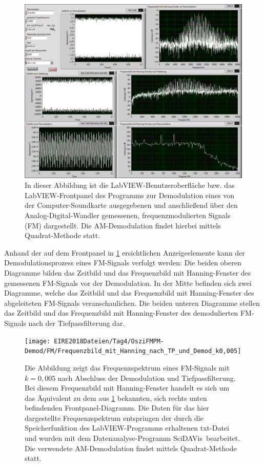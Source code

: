 \documentclass[
a4paper,
12pt,
pagesize,
ngerman
]{scrartcl}
\begin{document}
	\begin{figure}[H]
		\centering
		\includegraphics[width=1.0\textwidth]{EIRE2018Dateien/Tag4/OsziFMPM-Demod/FM/OsziPlusFMPMp}
		\caption{In dieser Abbildung ist die LabVIEW-Benutzeroberfläche bzw. das LabVIEW-Frontpanel des Programms zur Demodulation eines von der Computer-Soundkarte ausgegebenen und anschließend über den Analog-Digital-Wandler gemessenen, frequenzmodulierten Signals (\glqq FM\grqq ) dargestellt. Die AM-Demodulation findet hierbei mittels \glqq Quadrat\grqq -Methode statt.}
		\label{FMPMDemodFrontpanel}
	\end{figure}
	
	\noindent Anhand der auf dem Frontpanel in \cref{FMPMDemodFrontpanel} ersichtlichen Anzeigeelemente kann der Demodulationsprozess eines FM-Signals verfolgt werden:
	Die beiden oberen Diagramme bilden das Zeitbild und das Frequenzbild mit Hanning-Fenster des gemessenen FM-Signals vor der Demodulation.
	In der Mitte befinden sich zwei Diagramme, welche das Zeitbild und das Frequenzbild mit Hanning-Fenster des abgeleiteten FM-Signals veranschaulichen.
	Die beiden unteren Diagramme stellen das Zeitbild und das Frequenzbild mit Hanning-Fenster des demodulierten FM-Signals nach der Tiefpassfilterung dar.
	
	\begin{figure}[H] %
		\centering
		\texttt{[image: EIRE2018Dateien/Tag4/OsziFMPM-Demod/FM/Frequenzbild\_mit\_Hanning\_nach\_TP\_und\_Demod\_k0,005]}
		\caption{Die Abbildung zeigt das Frequenzspektrum eines FM-Signals mit $k=0,005$ nach Abschluss der Demodulation und Tiefpassfilterung. Bei diesem Frequenzbild mit Hanning-Fenster handelt es sich um das Äquivalent zu dem aus \cref{FMPMDemodFrontpanel} bekannten, sich rechts unten befindenden Frontpanel-Diagramm. Die Daten für das hier dargestellte Frequenzspektrum entspringen der durch die Speicherfunktion des LabVIEW-Programms erhaltenen txt-Datei und wurden mit dem Datenanalyse-Programm \glqq SciDAVis\grqq\ bearbeitet. Die verwendete AM-Demodulation findet mittels \glqq Quadrat\grqq -Methode statt.}
		\label{FMDiagramm}
	\end{figure}
	
\end{document}
